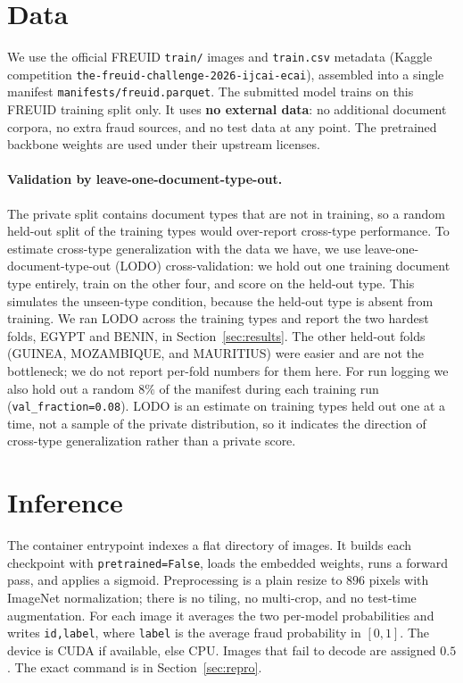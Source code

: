 \documentclass[11pt,a4paper]{article}
\begin{document}
\section{Data}
\label{sec:data}
We use the official FREUID \texttt{train/} images and \texttt{train.csv} metadata (Kaggle competition
\texttt{the-freuid-challenge-2026-ijcai-ecai}), assembled into a single manifest
\texttt{manifests/freuid.parquet}. The submitted model trains on this FREUID training split only. It uses
\textbf{no external data}: no additional document corpora, no extra fraud sources, and no test data at any
point. The pretrained backbone weights are used under their upstream licenses.

\paragraph{Validation by leave-one-document-type-out.}
The private split contains document types that are not in training, so a random held-out split of the
training types would over-report cross-type performance. To estimate cross-type generalization with the data
we have, we use leave-one-document-type-out (LODO) cross-validation: we hold out one training document type
entirely, train on the other four, and score on the held-out type. This simulates the unseen-type condition,
because the held-out type is absent from training. We ran LODO across the training types and report the two
hardest folds, EGYPT and BENIN, in Section~\ref{sec:results}. The other held-out folds (GUINEA, MOZAMBIQUE,
and MAURITIUS) were easier and are not the bottleneck; we do not report per-fold numbers for them here. For
run logging we also hold out a random $8\%$ of the manifest during each training run
(\texttt{val\_fraction=0.08}). LODO is an estimate on training types held out one at a time, not a sample of
the private distribution, so it indicates the direction of cross-type generalization rather than a private
score.

\section{Inference}
\label{sec:inference}
The container entrypoint indexes a flat directory of images. It builds each checkpoint with
\texttt{pretrained=False}, loads the embedded weights, runs a forward pass, and applies a sigmoid.
Preprocessing is a plain resize to $896$ pixels with ImageNet normalization; there is no tiling, no
multi-crop, and no test-time augmentation. For each image it averages the two per-model probabilities and
writes \texttt{id,label}, where \texttt{label} is the average fraud probability in $[0,1]$. The device is
CUDA if available, else CPU. Images that fail to decode are assigned $0.5$. The exact command is in
Section~\ref{sec:repro}.
\end{document}
